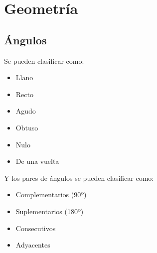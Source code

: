 \documentclass[10pt]{article}
\begin{document}
\newpage
\section{Geometría}
\subsection{Ángulos}
Se pueden clasificar como:
\begin{multicols}{3}
\begin{itemize}
\item Llano
\item Recto
\item Agudo
\item Obtuso
\item Nulo
\item De una vuelta
\end{itemize}
\end{multicols}
Y los pares de ángulos se pueden clasificar como:
\begin{multicols}{2}
\begin{itemize}
\item Complementarios (90º)
\item Suplementarios (180º)
\item Consecutivos
\item Adyacentes
\end{itemize}
\end{multicols}
\end{document}
